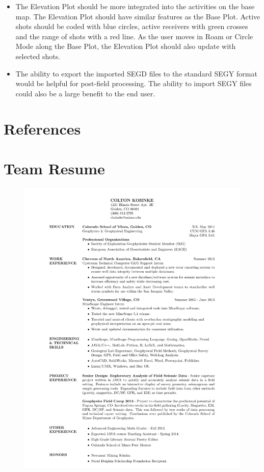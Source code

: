 \documentclass[12pt]{article}
\begin{document}
\begin{itemize}
\item The Elevation Plot should be more integrated into the activities on the base map. The Elevation Plot should have similar features as the Base Plot. Active shots should be coded with blue circles, active receivers with green crosses and the range of shots with a red line. As the user moves in Roam or Circle Mode along the Base Plot, the Elevation Plot should also update with selected shots.

\item The ability to export the imported SEGD files to the standard SEGY format would be helpful for post-field processing. The ability to import SEGY files could also be a large benefit to the end user.
\end{itemize}

\newpage
\section{References}

\printbibliography

\newpage
\section{Team Resume}

\begin{figure}[H]
\includegraphics[scale=0.80]{./Resume_of_Colton_Kohnke.pdf}
\end{figure}
\end{document}
